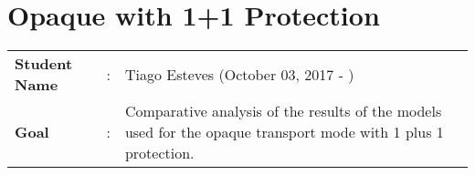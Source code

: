 \clearpage

\section{Opaque with 1+1 Protection}\label{comparative_Opaque_Protection}
\begin{tcolorbox}	
\begin{tabular}{p{2.75cm} p{0.2cm} p{10.5cm}} 	
\textbf{Student Name}  &:& Tiago Esteves    (October 03, 2017 - )\\
\textbf{Goal}          &:& Comparative analysis of the results of the models used for the opaque transport mode with 1 plus 1 protection.
\end{tabular}
\end{tcolorbox}
\vspace{11pt}

